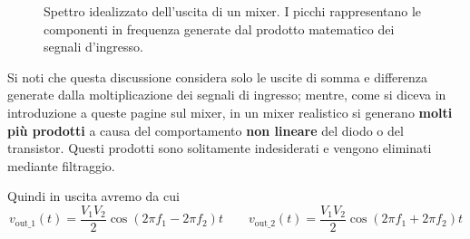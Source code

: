 \documentclass[openany,a4paper,12pt]{book}
\begin{document}
\begin{figure}[H]
    \centering
    \caption*{Spettro idealizzato dell'uscita di un mixer. I picchi rappresentano le componenti in frequenza generate dal prodotto matematico dei segnali d'ingresso.}
\end{figure}
\vspace{0.5cm}
Si noti che questa discussione considera solo le uscite di somma e differenza generate dalla moltiplicazione dei segnali di ingresso; mentre, come si diceva in introduzione a queste pagine sul mixer, in un mixer realistico si generano \textbf{molti più prodotti} a causa del comportamento \textbf{non lineare} del diodo o del transistor. Questi prodotti sono solitamente indesiderati e vengono eliminati mediante filtraggio.

Quindi in uscita avremo
da cui
\[
v_{\text{out}\_1}(t) = \frac{V_1 V_2}{2}\cos(2\pi f_1 - 2\pi f_2)t 
\qquad 
v_{\text{out}\_2}(t) = \frac{V_1 V_2}{2}\cos(2\pi f_1 + 2\pi f_2)t
\]
\end{document}
